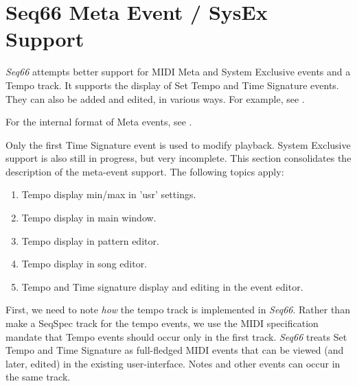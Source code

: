 %
%
%

\section{Seq66 Meta Event / SysEx Support}
\label{sec:meta_events}

   \textsl{Seq66} attempts better support
   for MIDI Meta and System Exclusive events and a Tempo track.
   It supports the display of Set Tempo and Time Signature events.
   They can also be added and edited, in
   various ways.  For example, see .

   For the internal format of Meta events,
   see .

   Only the first Time Signature event is used to modify playback.
   System Exclusive support is also still in progress, but very incomplete.
   This section consolidates the description of the meta-event support.
   The following topics apply:

   \begin{enumerate}
      \item Tempo display min/max in 'usr' settings.
      \item Tempo display in main window.
      \item Tempo display in pattern editor.
      \item Tempo display in song editor.
      \item Tempo and Time signature display and editing in the event editor.
   \end{enumerate}

   First, we need to note \textsl{how} the tempo track is
   implemented in \textsl{Seq66}.  Rather than make a SeqSpec track for
   the tempo events, we use the MIDI specification mandate that
   Tempo events should occur only in the first track.
   \textsl{Seq66} treats Set Tempo and Time Signature as full-fledged
   MIDI events that can be viewed (and later, edited) in the existing
   user-interface.  Notes and other events can occur in the same
   track.

